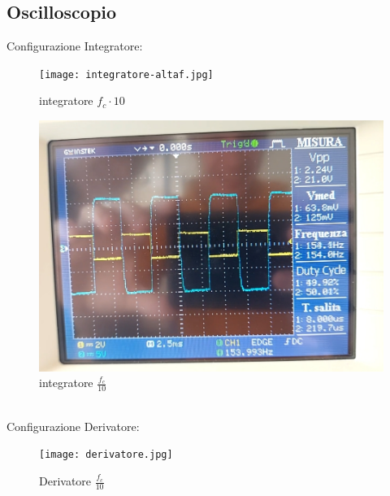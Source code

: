 \documentclass[12pt]{article}
\begin{document}
\subsection{Oscilloscopio}
Configurazione Integratore:
\begin{figure}[h]
    \centering
   \texttt{[image: integratore-altaf.jpg]}
    \caption{integratore $f_c \cdot 10$}
\end{figure}
\begin{figure}[h]
    \centering
    \includegraphics[scale=0.2]{integratore-bassaf.jpg}
    \caption{integratore $\frac{f_c}{10}$}
\end{figure}
\\
Configurazione Derivatore:
\begin{figure}[!h]
    \centering
    \texttt{[image: derivatore.jpg]}
    \caption{Derivatore $\frac{f_c}{10}$}

\end{figure}
\\
\end{document}
